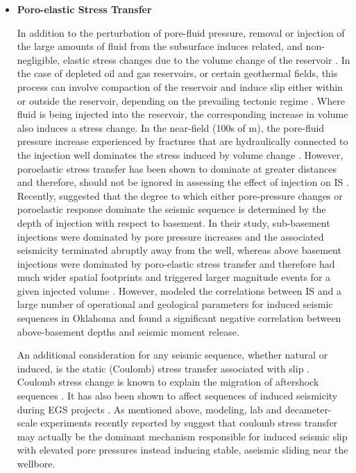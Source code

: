 \begin{itemize}
  \item{\textbf{Poro-elastic Stress Transfer}}
  
  In addition to the perturbation of pore-fluid pressure, removal or injection of the large amounts of fluid from the subsurface induces related, and non-negligible, elastic stress changes due to the volume change of the reservoir \citep{2013}. In the case of depleted oil and gas reservoirs, or certain geothermal fields, this process can involve compaction of the reservoir and induce slip either within or outside the reservoir, depending on the prevailing tectonic regime \citep{Segall_1994,Segall_1998}. Where fluid is being injected into the reservoir, the corresponding increase in volume also induces a stress change. In the near-field (100s of m), the pore-fluid pressure increase experienced by fractures that are hydraulically connected to the injection well dominates the stress induced by volume change \citep{2013}. However, poroelastic stress transfer has been shown to dominate at greater distances and therefore, should not be ignored in assessing the effect of injection on IS \citep{Goebel_2017}. Recently, \citet{Goebel_2018} suggested that the degree to which either pore-pressure changes or poroelastic response dominate the seismic sequence is determined by the depth of injection with respect to basement. In their study, sub-basement injections were dominated by pore pressure increases and the associated seismicity terminated abruptly away from the well, whereas above basement injections were dominated by poro-elastic stress transfer and therefore had much wider spatial footprints and triggered larger magnitude events for a given injected volume \citep{Goebel_2018}. However, \citet{Hincks_2018} modeled the correlations between IS and a large number of operational and geological parameters for induced seismic sequences in Oklahoma and found a significant negative correlation between above-basement depths and seismic moment release. 
  
  An additional consideration for any seismic sequence, whether natural or induced, is the static (Coulomb) stress transfer associated with slip \citep{okada1992internal}. Coulomb stress change is known to explain the migration of aftershock sequences \citep[e.g.][]{Toda_2003}. It has also been shown to affect sequences of induced seismicity during EGS projects \citep{Catalli_2016,Schoenball_2012}. As mentioned above, modeling, lab and decameter-scale experiments recently reported by \citet{cappa2019stabilization} suggest that coulomb stress transfer may actually be the dominant mechanism responsible for induced seismic slip with elevated pore pressures instead inducing stable, aseismic sliding near the wellbore.


\end{itemize}
